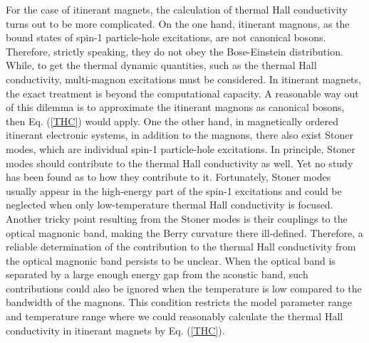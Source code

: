 \documentclass[amsmath,superscriptaddress,showpacs,aps,prl,onecolumn,notitlepage]{revtex4-1}
\begin{document}
\par For the case of itinerant magnets, the calculation of thermal Hall conductivity turns out to be more complicated. On the one hand, itinerant magnons, as the bound states of spin-1 particle-hole excitations, are not canonical bosons. Therefore, strictly speaking, they do not obey the Bose-Einstein distribution. While, to get the thermal dynamic quantities, such as the thermal Hall conductivity, multi-magnon excitations must be considered. In itinerant magnets, the exact treatment is beyond the computational capacity. A reasonable way out of this dilemma is to approximate the itinerant magnons as canonical bosons, then Eq. (\ref{THC}) would apply. One the other hand, in magnetically ordered itinerant electronic systems, in addition to the magnons, there also exist Stoner modes, which are individual spin-1 particle-hole excitations. In principle, Stoner modes should contribute to the thermal Hall conductivity as well. Yet no study has been found as to how they contribute to it. Fortunately, Stoner modes usually appear in the high-energy part of the spin-1 excitations and could be neglected when only low-temperature thermal Hall conductivity is focused. Another tricky point resulting from the Stoner modes is their couplings to the optical magnonic band, making the Berry curvature there ill-defined. Therefore, a reliable determination of the contribution to the thermal Hall conductivity from the optical magnonic band persists to be unclear. When the optical band is separated by a large enough energy gap from the acoustic band, such contributions could also be ignored when the temperature is low compared to the bandwidth of the magnons. This condition restricts the model parameter range and temperature range where we could reasonably calculate the thermal Hall conductivity in itinerant magnets by Eq. (\ref{THC}).
\end{document}
